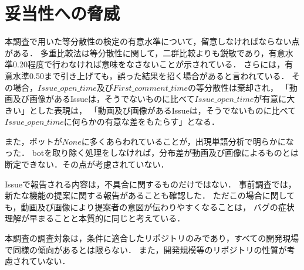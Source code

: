 \section{妥当性への脅威\label{threats}}


本調査で用いた等分散性の検定の有意水準について，留意しなければならない点がある．
多重比較法は等分散性に関して，二群比較よりも鋭敏であり，有意水準0.20程度で行わなければ意味をなさないことが示されている．\cite{Test_Level}
さらには，有意水準0.50まで引き上げても，誤った結果を招く場合があると言われている．
その場合，$Issue\_open\_time$及び$First\_comment\_time$の等分散性は棄却され，
「動画及び画像があるIssueは，そうでないものに比べて$Issue\_open\_time$が有意に大きい」とした表現は，
「動画及び画像があるIssueは，そうでないものに比べて$Issue\_open\_time$に何らかの有意な差をもたらす」となる．

また，ボットが$None$に多くあらわれていることが，出現単語分析で明らかになった．
botを取り除く処理をしなければ，分布差が動画及び画像によるものとは断定できない．その点が考慮されていない．

Issueで報告される内容は，不具合に関するものだけではない．
事前調査では，新たな機能の提案に関する報告があることも確認した．
ただこの場合に関しても，動画及び画像により提案者の意図が伝わりやすくなることは，
バグの症状理解が早まることと本質的に同じと考えている．

本調査の調査対象は，条件に適合したリポジトリのみであり，すべての開発現場で同様の傾向があるとは限らない．
また，開発規模等のリポジトリの性質が考慮されていない．